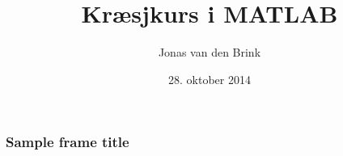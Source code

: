 \documentclass{beamer}
\title{Kræsjkurs i MATLAB}
\author{Jonas van den Brink}
\institute{Tekna Student Oslo}
\date{28. oktober 2014}
\begin{document}
 
\frame{\titlepage}
 
\begin{frame}
\frametitle{Sample frame title}
\end{frame}
 
\end{document}
